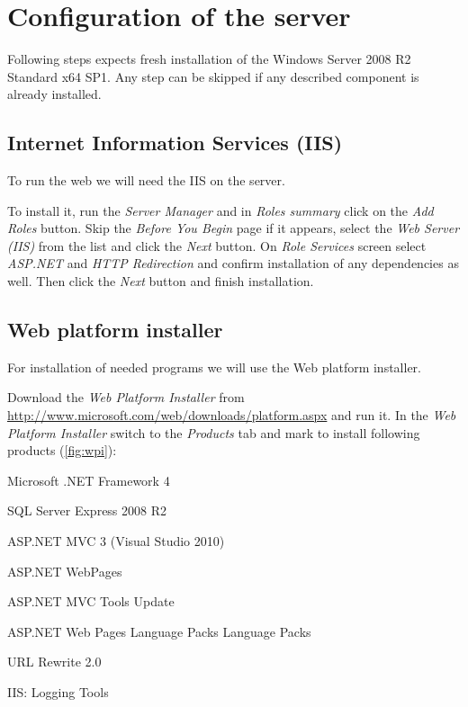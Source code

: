  

\section{Configuration of the server}

Following steps expects fresh installation of the Windows Server 2008 R2 Standard x64 SP1.
Any step can be skipped if any described component is already installed.


\subsection{Internet Information Services (IIS)}

To run the web we will need the IIS on the server.

To install it, run the \emph{Server Manager} and in \emph{Roles summary} click on the \emph{Add Roles} button.
Skip the \emph{Before You Begin} page if it appears, select the \emph{Web Server (IIS)} from the list and click the \emph{Next} button.
On \emph{Role Services} screen select \emph{ASP.NET} and \emph{HTTP Redirection} and confirm installation of any dependencies as well.
Then click the \emph{Next} button and finish installation.


\subsection{Web platform installer}

For installation of needed programs we will use the Web platform installer.

Download the \emph{Web Platform Installer} from \url{http://www.microsoft.com/web/downloads/platform.aspx} and run it.
In the \emph{Web Platform Installer} switch to the \emph{Products} tab and mark to install following products (\autoref{fig:wpi}):
\begin{itemize*}
	\item Microsoft .NET Framework 4
	\item SQL Server Express 2008 R2
	\item ASP.NET MVC 3 (Visual Studio 2010)
	\item ASP.NET WebPages
	\item ASP.NET MVC Tools Update
	\item ASP.NET Web Pages Language Packs Language Packs
	\item URL Rewrite 2.0
	\item IIS: Logging Tools
\end{itemize*}

